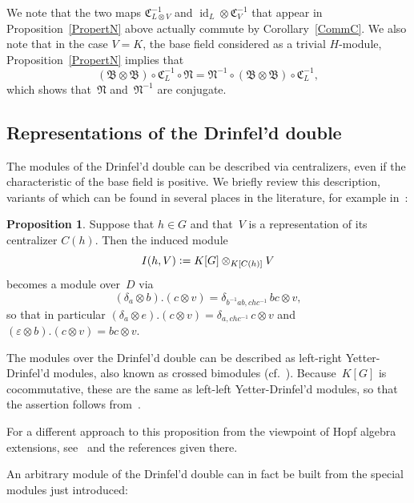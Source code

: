 \documentclass[12pt]{article}
\makeatletter
\theoremstyle{definition}
\newtheorem{Proposition}[Satz]{Proposition}
\theoremstyle{break}
\renewenvironment{proof}[1][\proofname]{\par
\vspace{-5pt}%
\pushQED{\qed}%
\normalfont
\topsep0pt \partopsep0pt %
\trivlist
\item[\hskip\labelsep
\bfseries
#1\@addpunct{.}]\ignorespaces
}{%
\popQED\endtrivlist\@endpefalse
\addvspace{6pt plus 6pt} %
}
\DeclareMathOperator\id{id}
\newcommand{\fB}{\mathfrak{B}}
\newcommand{\fC}{\mathfrak{C}}
\newcommand{\fN}{\mathfrak{N}}
\renewcommand{\1}{\mathbbm{1}}
\newcommand{\ot}{\mathbin{\otimes}}
\newcommand{\deq}{\vcentcolon =}
\newcommand\Cent{C}
\makeatother
\begin{document}
We note that the two maps $\fC_{L \ot V}^{-1}$ and $\id_L \ot \fC_V^{-1}$ that appear in Proposition~\ref{PropertN} above actually commute by Corollary~\ref{CommC}.
We also note that in the case $V=K$, the base field considered as a trivial $H$-module, Proposition~\ref{PropertN} implies that
\[(\fB \ot \fB)  \circ \fC_L^{-1} \circ \fN =
\fN^{-1}  \circ (\fB \ot \fB) \circ \fC_L^{-1},\]
which shows that~$\fN$ and~$\fN^{-1}$ are conjugate.


\subsection{Representations of the Drinfel'd double} \label{RepDrinf} 
The modules of the Drinfel'd double can be described via centralizers, even if the characteristic of the base field is positive. We briefly review this description, variants of which can be found in several places in the literature, for example in~\cite[Cor.~2.3, p.~314]{W1}:
\begin{Proposition} \label{PropRepDrinf}
Suppose that $h \in G$ and that~$V$ is a representation of its centralizer $\Cent(h)$. Then the induced module
\[I(h, V) \deq K[G] \ot_{K[\Cent(h)]} V \]
becomes a module over~$D$ via
\[(\delta_a \ot b).(c \ot v) = \delta_{b^{-1}ab, chc^{-1}} \, bc \ot v, \]
so that in particular
$(\delta_a \ot e).(c \ot v) = \delta_{a, chc^{-1}} \, c \ot v$ and
$(\varepsilon \ot b).(c \ot v) = bc \ot v$.
\end{Proposition}
\begin{proof}
The modules over the Drinfel'd double can be described as left-right Yetter-Drinfel'd modules, also known as crossed bimodules (cf.~\cite[Thm.~IX.5.2, p.~221]{Ka}). Because~$K[G]$ is cocommutative, these are the same as left-left Yetter-Drinfel'd modules, so that the assertion follows from~\cite[Def.~1.4.15, p.~32]{HeS}.  
\end{proof}

For a different approach to this proposition from the viewpoint of Hopf algebra extensions, see~\cite[Prop.~7.4, p.~54]{KSZ} and the references given there. 

An arbitrary module of the Drinfel'd double can in fact be built from the special modules just introduced:
\end{document}
